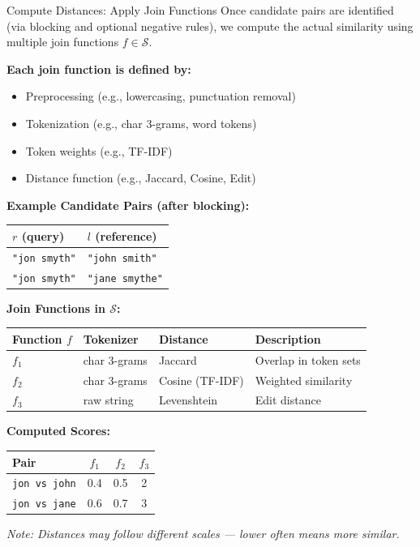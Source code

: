 \documentclass[8pt]{beamer} %
\begin{document}
\begin{frame}{Compute Distances: Apply Join Functions}
	Once candidate pairs are identified (via blocking and optional negative rules), we compute the actual similarity using multiple join functions $f \in \mathcal{S}$.
	
	\vspace{0.5em}
	\textbf{Each join function is defined by:}
	\begin{itemize}
		\item Preprocessing (e.g., lowercasing, punctuation removal)
		\item Tokenization (e.g., char 3-grams, word tokens)
		\item Token weights (e.g., TF-IDF)
		\item Distance function (e.g., Jaccard, Cosine, Edit)
	\end{itemize}
	
	\vspace{0.5em}
	\textbf{Example Candidate Pairs (after blocking):}
	\begin{tabular}{ll}
		$r$ (query) & $l$ (reference) \\
		\hline
		\texttt{"jon smyth"} & \texttt{"john smith"} \\
		\texttt{"jon smyth"} & \texttt{"jane smythe"} \\
	\end{tabular}
	
	\vspace{0.5em}
	\textbf{Join Functions in $\mathcal{S}$:}
	\begin{tabular}{llll}
		\textbf{Function $f$} & \textbf{Tokenizer} & \textbf{Distance} & \textbf{Description} \\
		\hline
		$f_1$ & char 3-grams & Jaccard & Overlap in token sets \\
		$f_2$ & char 3-grams & Cosine (TF-IDF) & Weighted similarity \\
		$f_3$ & raw string   & Levenshtein & Edit distance \\
	\end{tabular}
	
	\vspace{0.5em}
	\textbf{Computed Scores:}
	\begin{tabular}{lccc}
		\textbf{Pair} & $f_1$ & $f_2$ & $f_3$ \\
		\hline
		\texttt{jon vs john} & 0.4 & 0.5 & 2 \\
		\texttt{jon vs jane} & 0.6 & 0.7 & 3 \\
	\end{tabular}
	
	\vspace{0.5em}
	\textit{Note: Distances may follow different scales — lower often means more similar.}
\end{frame}
\end{document}
